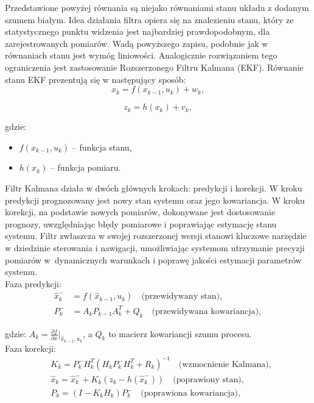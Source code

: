 Przedstawione powyżej równania są niejako równaniami stanu układu z dodanym szumem białym. Idea działania filtra opiera się na znalezieniu stanu, który ze statystycznego punktu widzenia jest najbardziej prawdopodobnym, dla zarejestrowanych pomiarów. Wadą powyższego zapisu, podobnie jak w równaniach stanu jest wymóg liniowości. Analogicznie rozwiązaniem tego ograniczenia jest zastosowanie Rozszerzonego Filtru Kalmana (EKF). Równanie stanu EKF prezentują się w następujący sposób:
\[
  x_k =  f \left( x_{k-1},  u_k \right) + w_k,
\]

\[
  z_k = h \left(x_k \right) + v_k,
\]

gdzie:
\begin{itemize}
  \item $ f \left( x_{k-1},  u_k \right)$ -- funkcja stanu, 
  \item $h \left(x_k \right)$ -- funkcja pomiaru.
\end{itemize}

Filtr Kalmana działa w dwóch głównych krokach: predykcji i korekcji. W kroku predykcji prognozowany jest nowy stan systemu oraz jego kowariancja. W kroku korekcji, na podstawie nowych pomiarów, dokonywane jest dostosowanie prognozy, uwzględniając błędy pomiarowe i poprawiając estymację stanu systemu. Filtr zwłaszcza w swojej rozszerzonej wersji stanowi kluczowe narzędzie w dziedzinie sterowania i nawigacji, umożliwiając systemom utrzymanie precyzji pomiarów w~dynamicznych warunkach i poprawę jakości estymacji parametrów systemu.\\

Faza predykcji:
\[
\begin{aligned}
  \hat{x}_k^- & = f(\hat{x}_{k-1}, u_k) \quad \text{(przewidywany stan)}, \\
  P_k^- & = A_k P_{k-1} A_k^T + Q_k \quad \text{(przewidywana kowariancja)},
\end{aligned}
\]

gdzie: $A_k = \frac{\partial f}{\partial x}\Bigr|_{\hat{x}_{k-1}, u_k}$, a $Q_k$ to macierz kowariancji szumu procesu.\\

Faza korekcji:
\[
\begin{aligned}
  &K_k = P_k^- H_k^T (H_k P_k^- H_k^T + R_k)^{-1} \quad \text{(wzmocnienie Kalmana)}, \\
  &\hat{x}_k = \hat{x}_k^- + K_k(z_k - h(\hat{x}_k^-)) \quad \text{(poprawiony stan)}, \\
  &P_k = (I - K_k H_k) P_k^- \quad \text{(poprawiona kowariancja)},
\end{aligned}
\]

